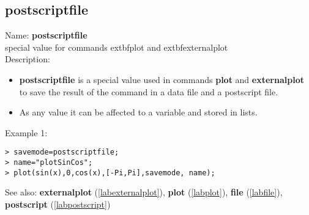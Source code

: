 \subsection{postscriptfile}
\label{labpostscriptfile}
\noindent Name: \textbf{postscriptfile}\\
special value for commands 	extbf{plot} and 	extbf{externalplot}\\
\noindent Description: \begin{itemize}

\item \textbf{postscriptfile} is a special value used in commands \textbf{plot} and \textbf{externalplot} to save
   the result of the command in a data file and a postscript file.

\item As any value it can be affected to a variable and stored in lists.
\end{itemize}
\noindent Example 1: 
\begin{center}\begin{minipage}{15cm}\begin{Verbatim}[frame=single]
> savemode=postscriptfile;
> name="plotSinCos";
> plot(sin(x),0,cos(x),[-Pi,Pi],savemode, name);
\end{Verbatim}
\end{minipage}\end{center}
See also: \textbf{externalplot} (\ref{labexternalplot}), \textbf{plot} (\ref{labplot}), \textbf{file} (\ref{labfile}), \textbf{postscript} (\ref{labpostscript})

